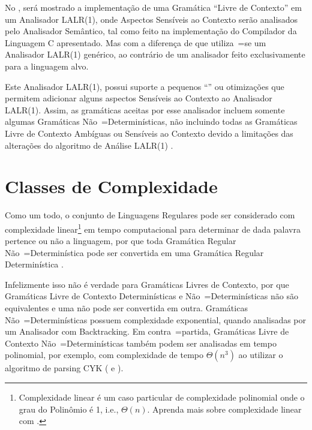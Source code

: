 {    No ,
    será mostrado a implementação de uma Gramática ``Livre de Contexto'' em um Analisador LALR(1),
    onde Aspectos Sensíveis ao Contexto serão analisados pelo Analisador Semântico,
    tal como feito na implementação do Compilador da Linguagem C apresentado.
    Mas com a diferença de que utiliza~=se um Analisador LALR(1) genérico,
    ao contrário de um analisador feito exclusivamente para a linguagem alvo.

    Este Analisador LALR(1),
    possui suporte a pequenos ``\textit{}'' ou
    otimizações que permitem adicionar alguns aspectos Sensíveis ao Contexto ao Analisador LALR(1).
    Assim,
    as gramáticas aceitas por esse analisador incluem somente algumas Gramáticas Não~=Determinísticas,
    não incluindo todas as Gramáticas Livre de Contexto Ambíguas ou
    Sensíveis ao Contexto devido a limitações das alterações do algoritmo de Análise LALR(1) \cite{larkContextualLexer}.


\section{Classes de Complexidade}
\label{classesDeComplexidade}

    Como um todo,
    o conjunto de Linguagens Regulares pode ser considerado com complexidade linear\footnote{
    Complexidade linear é um caso particular de complexidade polinomial onde o grau do Polinômio é 1,
    i.e.,
    $\Theta(n)$.
    Aprenda mais sobre complexidade linear com .
    }
    em tempo computacional para determinar de dada palavra pertence ou
    não a linguagem,
    por que toda Gramática Regular Não~=Determinística pode ser convertida em uma Gramática Regular Determinística \cite{sipserBook}.

    Infelizmente isso não é verdade para Gramáticas Livres de Contexto,
    por que Gramáticas Livre de Contexto Determinísticas e
    Não~=Determinísticas não são equivalentes e
    uma não pode ser convertida em outra.
    Gramáticas Não~=Determinísticas possuem complexidade exponential,
    quando analisadas por um Analisador com Backtracking.
    Em contra~=partida,
    Gramáticas Livre de Contexto Não~=Determinísticas também podem ser analisadas em tempo polinomial,
    por exemplo,
    com complexidade de tempo $\Theta(n^3)$ ao utilizar o algoritmo de parsing CYK ( e
    ).


}
